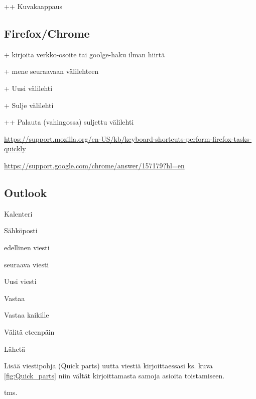 \documentclass[a4paper,12pt]{scrartcl}
\begin{document}
+\keys{\shift}+ Kuvakaappaus

\subsection{Firefox/Chrome}

+ kirjoita verkko-osoite tai goolge-haku ilman hiirtä

+ mene seuraavaan välilehteen

+ Uusi välilehti

+ Sulje välilehti

+\keys{\shift}+ Palauta (vahingossa) suljettu välilehti



\url{https://support.mozilla.org/en-US/kb/keyboard-shortcuts-perform-firefox-tasks-quickly}





\url{https://support.google.com/chrome/answer/157179?hl=en}


\subsection{Outlook}

 Kalenteri

 Sähköposti

\keys{\ctrl + ,} edellinen viesti

 seuraava viesti

 Uusi viesti

 Vastaa

 Vastaa kaikille

 Välitä eteenpäin

\keys{\ctrl + \return} Lähetä

\medskip

Lisää viestipohja (Quick parts) uutta viestiä kirjoittaessasi ks. kuva \ref{fig:Quick_parts}  niin vältät kirjoittamasta samoja asioita toistamiseen.

 tms.

\end{document}
